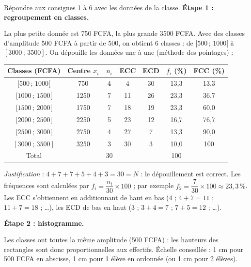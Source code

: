 \documentclass[11pt]{article}
\begin{document}
\begin{exoresolu}
Répondre aux consignes 1 à 6 avec les données de la classe.
\tcblower
\textbf{Étape 1 : regroupement en classes.}

La plus petite donnée est 750 FCFA, la plus grande 3500 FCFA. Avec des classes d'amplitude 500 FCFA à partir de 500, on obtient 6 classes : de $[500\,;\,1000[$ à $[3000\,;\,3500]$. On dépouille les données une à une (méthode des pointages) :

\begin{center}
\begin{tabular}{|c|c|c|c|c|c|c|}
\hline
\rowcolor{popblueL}
Classes (FCFA) & Centre $x_i$ & $n_i$ & ECC & ECD & $f_i$ (\%) & FCC (\%) \\
\hline
$[500\,;\,1000[$ & 750 & 4 & 4 & 30 & 13,3 & 13,3 \\
\hline
$[1000\,;\,1500[$ & 1250 & 7 & 11 & 26 & 23,3 & 36,7 \\
\hline
$[1500\,;\,2000[$ & 1750 & 7 & 18 & 19 & 23,3 & 60,0 \\
\hline
$[2000\,;\,2500[$ & 2250 & 5 & 23 & 12 & 16,7 & 76,7 \\
\hline
$[2500\,;\,3000[$ & 2750 & 4 & 27 & 7 & 13,3 & 90,0 \\
\hline
$[3000\,;\,3500]$ & 3250 & 3 & 30 & 3 & 10,0 & 100 \\
\hline
\rowcolor{popcream}
Total & & 30 & & & 100 & \\
\hline
\end{tabular}
\end{center}

\emph{Justification} : $4+7+7+5+4+3 = 30 = N$ : le dépouillement est correct. Les fréquences sont calculées par $f_i = \dfrac{n_i}{30}\times 100$ ; par exemple $f_2 = \dfrac{7}{30}\times 100 \approx 23,3\,\%$. Les ECC s'obtiennent en additionnant de haut en bas ($4$ ; $4+7=11$ ; $11+7=18$ ; \dots), les ECD de bas en haut ($3$ ; $3+4=7$ ; $7+5=12$ ; \dots).

\textbf{Étape 2 : histogramme.}

Les classes ont toutes la même amplitude (500 FCFA) : les hauteurs des rectangles sont donc proportionnelles aux effectifs. Échelle conseillée : 1 cm pour 500 FCFA en abscisse, 1 cm pour 1 élève en ordonnée (ou 1 cm pour 2 élèves).


\end{exoresolu}
\end{document}
